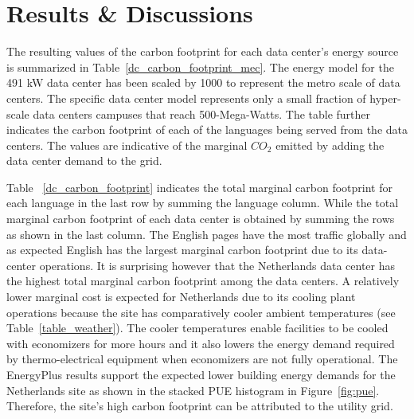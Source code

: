 \section{Results \& Discussions}
The resulting values of the carbon footprint for each data center's energy source is summarized in Table~\ref{dc_carbon_footprint_mec}. The energy model for the 491 kW data center has been scaled by 1000 to represent the metro scale of data centers. The specific data center model represents only a small fraction of hyper-scale data centers campuses that reach 500-Mega-Watts. The table further indicates the carbon footprint of each of the languages being served from the data centers. The values are indicative of the marginal $CO_{2}$ emitted by adding the data center demand to the grid.



 


Table~ \ref{dc_carbon_footprint} indicates the total marginal carbon footprint for each language in the last row by summing the language column. While the total marginal carbon footprint of each data center is obtained by summing the rows as shown in the last column. The English pages have the most traffic globally and as expected English has the largest marginal carbon footprint due to its data-center operations. It is surprising however that the Netherlands data center has the highest total marginal carbon footprint among the data centers. A relatively lower marginal cost is expected for Netherlands due to its cooling plant operations because the site has comparatively cooler ambient temperatures (see Table~\ref{table_weather}). The cooler temperatures enable facilities to be cooled with economizers for more hours and it also lowers the energy demand required by thermo-electrical equipment when economizers are not fully operational. The EnergyPlus results support the expected lower building energy demands for the Netherlands site as shown in the stacked PUE histogram in Figure~\ref{fig:pue}. Therefore, the site's high carbon footprint can be attributed to the utility grid.

